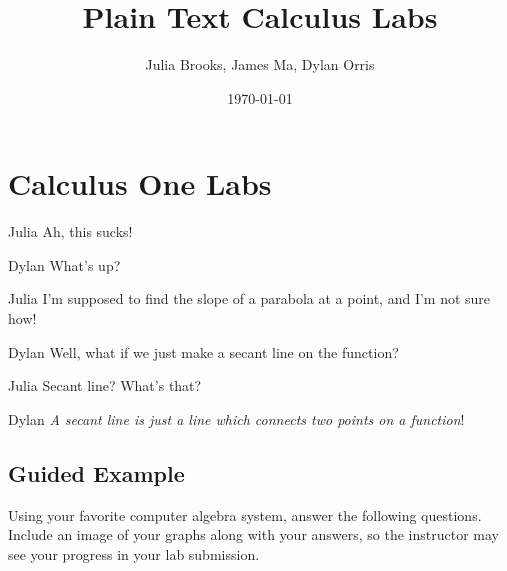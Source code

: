 \documentclass{ximera}
\begin{document}
\title{Plain Text Calculus Labs}
\author{Julia Brooks, James Ma, Dylan Orris}
\date{\today}

\section{Calculus One Labs}

\begin{dialogue}
\item[Julia] Ah, this sucks!
\item[Dylan] What's up?
\item[Julia] I'm supposed to find the slope of a parabola at a point, and I'm not sure how!
\item[Dylan] Well, what if we just make a secant line on the function?
\item[Julia] Secant line? What's that?
\item[Dylan] \textit{A secant line is just a line which connects two points on a function}!
\end{dialogue}

\subsection{Guided Example}
Using your favorite computer algebra system, answer the following questions. Include an image of your graphs along with your answers, so the instructor may see your progress in your lab submission.
\end{document}

